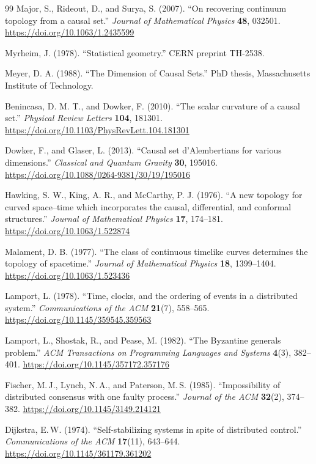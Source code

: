 \documentclass[11pt]{article}
\theoremstyle{definition}
\theoremstyle{remark}
\begin{document}
{\begin{thebibliography}{99}
Major, S., Rideout, D., and Surya, S. (2007). ``On recovering continuum
topology from a causal set.'' \emph{Journal of Mathematical Physics}
\textbf{48}, 032501.
\url{https://doi.org/10.1063/1.2435599}

Myrheim, J. (1978). ``Statistical geometry.'' CERN preprint TH-2538.

Meyer, D. A. (1988). ``The Dimension of Causal Sets.'' PhD thesis,
Massachusetts Institute of Technology.

Benincasa, D. M. T., and Dowker, F. (2010). ``The scalar curvature of a
causal set.'' \emph{Physical Review Letters} \textbf{104}, 181301.
\url{https://doi.org/10.1103/PhysRevLett.104.181301}

Dowker, F., and Glaser, L. (2013). ``Causal set d'Alembertians for various
dimensions.'' \emph{Classical and Quantum Gravity} \textbf{30}, 195016.
\url{https://doi.org/10.1088/0264-9381/30/19/195016}

Hawking, S. W., King, A. R., and McCarthy, P. J. (1976). ``A new
topology for curved space--time which incorporates the causal,
differential, and conformal structures.'' \emph{Journal of Mathematical
Physics} \textbf{17}, 174--181.
\url{https://doi.org/10.1063/1.522874}

Malament, D. B. (1977). ``The class of continuous timelike curves
determines the topology of spacetime.'' \emph{Journal of Mathematical
Physics} \textbf{18}, 1399--1404.
\url{https://doi.org/10.1063/1.523436}

Lamport, L. (1978). ``Time, clocks, and the ordering of events in a
distributed system.'' \emph{Communications of the ACM} \textbf{21}(7),
558--565.
\url{https://doi.org/10.1145/359545.359563}

Lamport, L., Shostak, R., and Pease, M. (1982). ``The Byzantine generals
problem.'' \emph{ACM Transactions on Programming Languages and Systems}
\textbf{4}(3), 382--401.
\url{https://doi.org/10.1145/357172.357176}

Fischer, M.\,J., Lynch, N.\,A., and Paterson, M.\,S. (1985).
``Impossibility of distributed consensus with one faulty process.''
\emph{Journal of the ACM} \textbf{32}(2), 374--382.
\url{https://doi.org/10.1145/3149.214121}

Dijkstra, E.\,W. (1974). ``Self-stabilizing systems in spite of distributed control.'' \emph{Communications of the ACM} \textbf{17}(11), 643--644. \url{https://doi.org/10.1145/361179.361202}


\end{thebibliography}}
\end{document}

